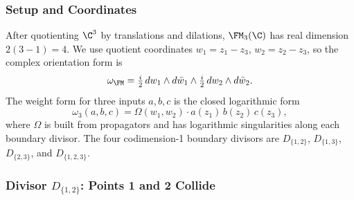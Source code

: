 \subsubsection{Setup and Coordinates}

After quotienting $\C^3$ by translations and dilations, $\FM_3(\C)$ has real dimension $2(3-1) = 4$. We use quotient coordinates $w_1 = z_1 - z_3$, $w_2 = z_2 - z_3$, so the complex orientation form is
\[
\omega_{\FM} = \tfrac{i}{2}\, dw_1 \wedge d\bar{w}_1 \wedge \tfrac{i}{2}\, dw_2 \wedge d\bar{w}_2.
\]
The weight form for three inputs $a, b, c$ is the closed logarithmic form
\[
\omega_3(a,b,c) = \Omega(w_1, w_2) \cdot a(z_1)\, b(z_2)\, c(z_3),
\]
where $\Omega$ is built from propagators and has logarithmic singularities along each boundary divisor. The four codimension-1 boundary divisors are $D_{\{1,2\}}$, $D_{\{1,3\}}$, $D_{\{2,3\}}$, and $D_{\{1,2,3\}}$.

\subsubsection{Divisor $D_{\{1,2\}}$: Points 1 and 2 Collide}

